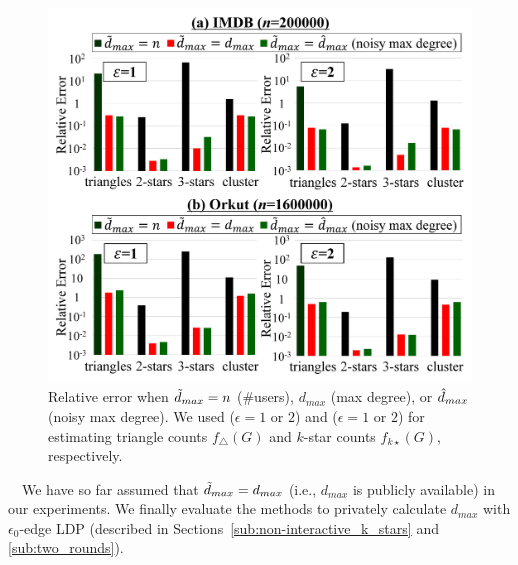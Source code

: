 \begin{figure}[t]
\centering
\includegraphics[width=0.99\linewidth]{fig/res4_noisy_max.pdf}
\vspace{-4mm}
\caption{Relative error 
when $\tilde{d}_{max} = n$ (\#users), 
$d_{max}$ (max degree), or 
$\hat{d}_{max}$ (noisy max degree). 
We used  ($\epsilon = 1$ or $2$) and  ($\epsilon = 1$ or $2$) for estimating triangle counts $f_\triangle(G)$ and $k$-star counts $f_{k\star}(G)$, respectively. 
}
\label{fig:res4_noisy_local}
\end{figure}

\smallskip
{}~~We have so far assumed that $\tilde{d}_{max} = d_{max}$ (i.e., $d_{max}$ is publicly available) in our experiments. 
We 
finally evaluate the methods to privately calculate $d_{max}$ with $\epsilon_0$-edge LDP 
(described in Sections~\ref{sub:non-interactive_k_stars} and \ref{sub:two_rounds}). 

